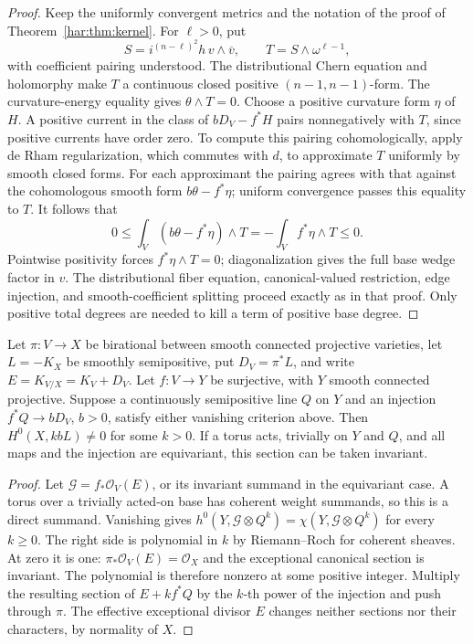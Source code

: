 \begin{proof}
Keep the uniformly convergent metrics and the notation of the proof of
Theorem~\ref{har:thm:kernel}. For \(\ell>0\), put
\[
 S=i^{(n-\ell)^2}h\,v\wedge\overline v,
 \qquad T=S\wedge\omega^{\ell-1},
\]
with coefficient pairing understood. The distributional Chern equation
and holomorphy make \(T\) a continuous closed positive
\((n-1,n-1)\)-form. The curvature-energy equality gives
\(\theta\wedge T=0\). Choose a positive curvature form \(\eta\) of
\(H\). A positive current in the class of
\(bD_V-f^*H\) pairs nonnegatively with \(T\), since positive currents
have order zero. To compute this pairing cohomologically, apply de Rham
regularization, which commutes with \(d\), to approximate \(T\)
uniformly by smooth closed forms. For each approximant the pairing
agrees with that against the cohomologous smooth form
\(b\theta-f^*\eta\); uniform convergence passes this equality to
\(T\). It follows that
\[
 0\le\int_V(b\theta-f^*\eta)\wedge T
       =-\int_V f^*\eta\wedge T\le0.
\]
Pointwise positivity forces \(f^*\eta\wedge T=0\); diagonalization gives
the full base wedge factor in \(v\). The distributional fiber equation,
canonical-valued restriction, edge injection, and smooth-coefficient
splitting proceed exactly as in that proof. Only positive total degrees
are needed to kill a term of positive base degree.
\end{proof}

\begin{proposition}\label{har:prop:euler}
Let \(\pi:V\to X\) be birational between smooth connected projective
varieties, let \(L=-K_X\) be smoothly semipositive, put
\(D_V=\pi^*L\), and write \(E=K_{V/X}=K_V+D_V\).
Let \(f:V\to Y\) be surjective, with \(Y\) smooth connected
projective. Suppose a continuously semipositive line \(Q\) on \(Y\)
and an injection \(f^*Q\to bD_V\), \(b>0\), satisfy either vanishing
criterion above. Then \(H^0(X,kbL)\ne0\) for some \(k>0\).
If a torus acts, trivially on \(Y\) and \(Q\), and all maps and the
injection are equivariant, this section can be taken invariant.
\end{proposition}

\begin{proof}
Let \(\mathcal G=f_*\mathcal O_V(E)\), or its invariant summand in the
equivariant case. A torus over a trivially acted-on base has coherent
weight summands, so this is a direct summand. Vanishing gives
\(h^0(Y,\mathcal G\otimes Q^k)=\chi(Y,\mathcal G\otimes Q^k)\) for every
\(k\ge0\). The right side is polynomial in \(k\) by Riemann--Roch for
coherent sheaves. At zero it is one: \(\pi_*\mathcal O_V(E)=\mathcal O_X\)
and the exceptional canonical section is invariant. The polynomial is
therefore nonzero at some positive integer. Multiply the resulting
section of \(E+kf^*Q\) by the \(k\)-th power of the injection and push
through \(\pi\). The effective exceptional divisor \(E\) changes neither
sections nor their characters, by normality of \(X\).
\end{proof}
